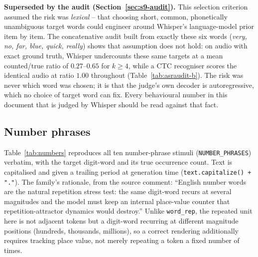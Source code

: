 \documentclass[11pt]{article}
\begin{document}
\noindent\textbf{Superseded by the audit (Section~\ref{sec:s9-audit}).} This
selection criterion assumed the risk was \emph{lexical} -- that choosing
short, common, phonetically unambiguous target words could engineer around
Whisper's language-model prior item by item. The concatenative audit built
from exactly these six words (\emph{very, no, far, blue, quick, really})
shows that assumption does not hold: on audio with exact ground truth,
Whisper undercounts these same targets at a mean counted/true ratio of
$0.27$--$0.65$ for $k\ge4$, while a CTC recogniser scores the identical audio
at ratio $1.00$ throughout (Table~\ref{tab:asraudit-b}). The risk was never
which word was chosen; it is that the judge's own decoder is autoregressive,
which no choice of target word can fix. Every behavioural number in this
document that is judged by Whisper should be read against that fact.

\subsection{Number phrases}

Table~\ref{tab:numbers} reproduces all ten number-phrase stimuli
(\texttt{NUMBER\_PHRASES}) verbatim, with the target digit-word and its true
occurrence count. Text is capitalised and given a trailing period at
generation time (\texttt{text.capitalize() + "."}). The family's rationale,
from the source comment: ``English number words are the natural repetition
stress test: the same digit-word recurs at several magnitudes and the model
must keep an internal place-value counter that repetition-attractor dynamics
would destroy.'' Unlike \texttt{word\_rep}, the repeated unit here is not
adjacent tokens but a digit-word recurring at different magnitude positions
(hundreds, thousands, millions), so a correct rendering additionally requires
tracking place value, not merely repeating a token a fixed number of times.
\end{document}
